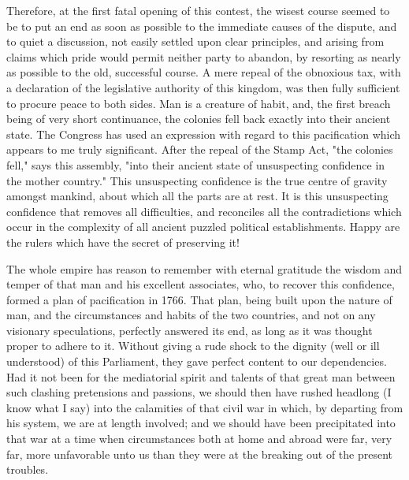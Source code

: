 Therefore, at the first fatal opening of this contest, the wisest course seemed to be to put an end as soon as possible to the immediate causes of the dispute, and to quiet a discussion, not easily settled upon clear principles, and arising from claims which pride would permit neither party to abandon, by resorting as nearly as possible to the old, successful course. A mere repeal of the obnoxious tax, with a declaration of the legislative authority of this kingdom, was then fully sufficient to procure peace to both sides. Man is a creature of habit, and, the first breach being of very short continuance, the colonies fell back exactly into their ancient state. The Congress has used an expression with regard to this pacification which appears to me truly significant. After the repeal of the Stamp Act, "the colonies fell," says this assembly, "into their ancient state of unsuspecting confidence in the mother country." This unsuspecting confidence is the true centre of gravity amongst mankind, about which all the parts are at rest. It is this unsuspecting confidence that removes all difficulties, and reconciles all the contradictions which occur in the complexity of all ancient puzzled political establishments. Happy are the rulers which have the secret of preserving it!

The whole empire has reason to remember with eternal gratitude the wisdom and temper of that man and his excellent associates, who, to recover this confidence, formed a plan of pacification in 1766. That plan, being built upon the nature of man, and the circumstances and habits of the two countries, and not on any visionary speculations, perfectly answered its end, as long as it was thought proper to adhere to it. Without giving a rude shock to the dignity (well or ill understood) of this Parliament, they gave perfect content to our dependencies. Had it not been for the mediatorial spirit and talents of that great man between such clashing pretensions and passions, we should then have rushed headlong (I know what I say) into the calamities of that civil war in which, by departing from his system, we are at length involved; and we should have been precipitated into that war at a time when circumstances both at home and abroad were far, very far, more unfavorable unto us than they were at the breaking out of the present troubles.

